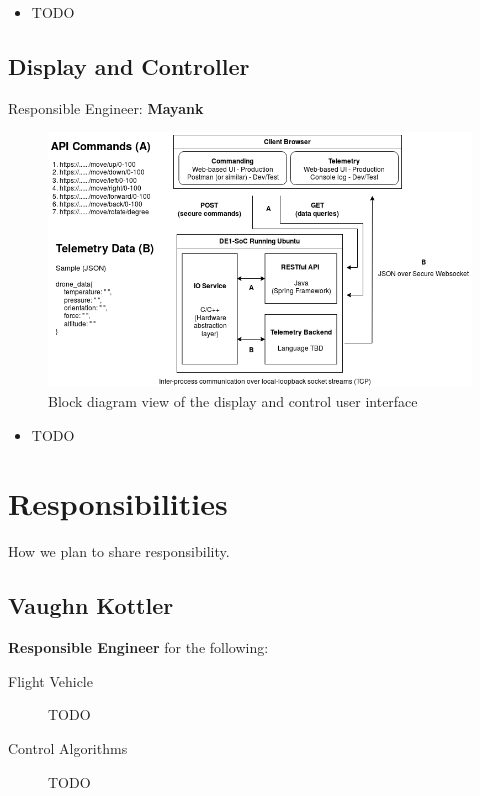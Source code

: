 \documentclass{article}
\begin{document}
\begin{itemize}
	\item TODO
\end{itemize}

\subsection{Display and Controller}

Responsible Engineer: \textbf{Mayank}

\begin{figure}[h]
	\centering
	\includegraphics[width=\linewidth]{../src/im/display_controller}
	\caption{Block diagram view of the display and control user
		interface}
\end{figure}

\begin{itemize}
	\item TODO
\end{itemize}

\section{Responsibilities}

How we plan to share responsibility.

\subsection{Vaughn Kottler}

\textbf{Responsible Engineer} for the following:

\begin{description}
	\item [Flight Vehicle] TODO
	\item [Control Algorithms] TODO
\end{description}
\end{document}
